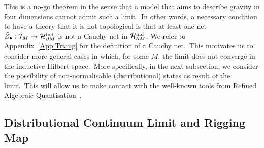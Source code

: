 \documentclass[11pt]{article}
\newcommand{\Hil}{\mathcal{H}}
\newcommand{\del}{\partial}
\theoremstyle{definition}
\numberwithin{equation}{section}
\begin{document}
This is a no-go theorem in the sense that a model that aims to describe gravity in four dimensions cannot admit such a limit.~In other words, a necessary condition to have a theory that it is not topological is that at least one net $\tilde{Z}_{\bullet}:\mathcal{T}_M\to \Hil^{\rm ind}_{\del M}$ is not a Cauchy net in $\Hil^{\rm ind}_{\del M}$. We refer to Appendix~\ref{App:Triang} for the definition of a Cauchy net.~This motivates us to consider more general cases in which, for some $M$, the limit does not converge in the inductive Hilbert space.~More specifically, in the next subsection, we consider the possibility of non-normalisable (distributional) states as result of the limit.~This will allow us to make contact with the well-known tools from Refined Algebraic Quantisation~\cite{Giulini_Marolf_1999a,Giulini_Marolf_1999b}.

\subsection{Distributional Continuum Limit and Rigging Map}
\end{document}
